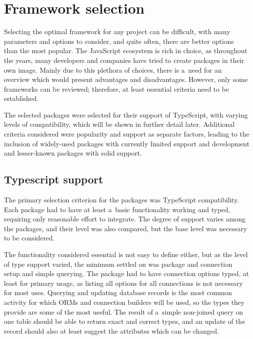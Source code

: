 \chapter{Framework selection}\label{ch:selection}

Selecting the optimal framework for any project can be difficult, with many
parameters and options to consider, and quite often, there are better options
than the most popular. The JavaScript ecosystem is rich in choice, as throughout
the years, many developers and companies have tried to create packages in their
own image. Mainly due to this plethora of choices, there is a~need for an
overview which would present advantages and disadvantages. However, only some
frameworks can be reviewed; therefore, at least essential criteria need to be
established. 

The selected packages were selected for their support of TypeScript, with
varying levels of compatibility, which will be shown in further detail later.
Additional criteria considered were popularity and support as separate factors,
leading to the inclusion of widely-used packages with currently limited support
and development and lesser-known packages with solid support. 

\section{Typescript support}

The primary selection criterion for the packages was TypeScript compatibility.
Each package had to have at least a~basic functionality working and typed,
requiring only reasonable effort to integrate. The degree of support varies
among the packages, and their level was also compared, but the base level was
necessary to be considered.

The functionality considered essential is not easy to define either, but as the
level of type support varied, the minimum settled on was package and connection
setup and simple querying. The package had to have connection options typed, at
least for primary usage, as listing all options for all connections is not
necessary for most uses. Querying and updating database records is the most
common activity for which ORMs and connection builders will be used, so the
types they provide are some of the most useful. The result of a~simple
non-joined query on one table should be able to return exact and correct types,
and an update of the record should also at least suggest the attributes which
can be changed.

